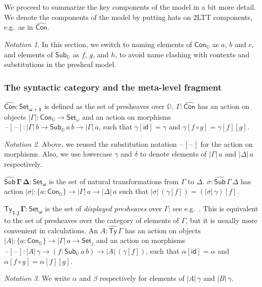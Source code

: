 \documentclass[acmsmall,review]{acmart}
\newcommand{\msf}[1]{\mathsf{#1}}
\newcommand{\mbb}[1]{\mathbb{#1}}
\newcommand{\bs}[1]{\boldsymbol{#1}}
\newcommand{\wh}[1]{\widehat{#1}}
\newcommand{\mbbo}{\mbb{O}}
\newcommand{\Con}{\msf{Con}}
\newcommand{\Cono}{\msf{Con}_{\mbbo}}
\newcommand{\Subo}{\msf{Sub}_{\mbbo}}
\newcommand{\hCon}{\wh{\msf{Con}}}
\newcommand{\hSub}{\wh{\msf{Sub}}}
\newcommand{\hTy}{\wh{\msf{Ty}}}
\newcommand{\id}{\msf{id}}
\newcommand{\Set}{\mathsf{Set}}
\newcommand{\blank}{{\mathord{\hspace{1pt}\text{--}\hspace{1pt}}}}
\theoremstyle{remark}
\newtheorem{notation}{Notation}
\begin{document}
We proceed to summarize the key components of the model in a bit more detail. We
denote the components of the model by putting hats on 2LTT components, e.g.\ as
in $\hCon$.

\begin{notation}
In this section, we switch to naming elements of $\Cono$ as $a$, $b$ and $c$,
and elements of $\Subo$ as $f$, $g$, and $h$, to avoid name clashing with
contexts and substitutions in the presheaf model.
\end{notation}

\subsubsection{The syntactic category and the meta-level fragment}

\begin{definition} $\bs{\wh{\Con} : \Set_{\omega+1}}$ is defined as the set of presheaves
over $\mbbo$. $\Gamma : \wh{\Con}$ has an action on objects $|\Gamma| :
\Cono \to \Set_\omega$ and an action on morphisms $\blank[\blank] : |\Gamma|\,b
\to \Subo\,a\,b \to |\Gamma|\,a$, such that $\gamma[\id] = \gamma$ and
$\gamma[f\circ g] = \gamma[f][g]$.

\begin{notation}
Above, we reused the substitution notation $\blank[\blank]$ for the action on
morphisms.  Also, we use lowercase $\gamma$ and $\delta$ to denote elements of
$|\Gamma|\,a$ and $|\Delta|\,a$ respectively.
\end{notation}

\end{definition}
\begin{definition} $\bs{\hSub\,\Gamma\,\Delta : \Set_\omega}$ is the set of natural transformations
from $\Gamma$ to $\Delta$. $\sigma : \hSub\,\Gamma\,\Delta$ has action
$|\sigma| : \{a : \Cono\} \to |\Gamma|\,a \to |\Delta|\,a$ such that
$|\sigma|\,(\gamma[f]) = (|\sigma|\,\gamma)[f]$.
\end{definition}

\begin{definition}
$\bs{\hTy_{1,j}\,\Gamma : \Set_\omega}$ is the set of \emph{displayed
presheaves} over $\Gamma$; see e.g.\ \cite[Chapter~1.2]{huber-thesis}. This is
equivalent to the set of presheaves over the category of elements of $\Gamma$,
but it is usually more convenient in calculations. An $A : \hTy\,\Gamma$ has
an action on objects $|A| : \{a : \Cono\} \to |\Gamma|\,a \to \Set_j$ and an
action on morphisms $\blank[\blank] : |A|\,\gamma \to (f : \Subo\,a\,b) \to
|A|\,(\gamma[f])$, such that $\alpha[\id] = \alpha$ and $\alpha[f \circ g] =
\alpha[f][g]$.

\begin{notation}
  We write $\alpha$ and $\beta$ respectively for elements of $|A|\,\gamma$ and
  $|B|\,\gamma$.
\end{notation}
\end{definition}
\end{document}
